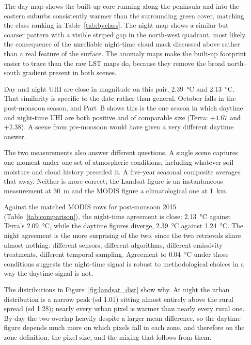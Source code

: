 \documentclass[11pt,a4paper]{article}
\begin{document}
The day map shows the built-up core running along the peninsula and
into the eastern suburbs consistently warmer than the surrounding
green cover, matching the class ranking in
Table~\ref{tab:byclass}. The night map shows a similar but coarser
pattern with a visible striped gap in the north-west quadrant, most
likely the consequence of the unreliable night-time cloud mask
discussed above rather than a real feature of the surface. The
anomaly maps make the built-up footprint easier to trace than the raw
LST maps do, because they remove the broad north--south gradient
present in both scenes.

Day and night UHI are close in magnitude on this pair,
\SI{2.39}{\degreeCelsius} and \SI{2.13}{\degreeCelsius}. That
similarity is specific to the date rather than general. October falls
in the post-monsoon season, and Part~B shows this is the one season in
which daytime and night-time UHI are both positive and of comparable
size (Terra: $+1.67$ and $+2.38$). A scene from pre-monsoon would have
given a very different daytime answer.

The two measurements also answer different questions. A single scene
captures one moment under one set of atmospheric conditions, including
whatever soil moisture and cloud history preceded it. A five-year
seasonal composite averages that away. Neither is more correct; the
Landsat figure is an instantaneous measurement at \SI{30}{\metre} and
the MODIS figure a climatological one at \SI{1}{\kilo\metre}.

Against the matched MODIS rows for post-monsoon 2015
(Table~\ref{tab:comparison}), the night-time agreement is close:
\SI{2.13}{\degreeCelsius} against Terra's \SI{2.09}{\degreeCelsius},
while the daytime figures diverge, \SI{2.39}{\degreeCelsius} against
\SI{1.24}{\degreeCelsius}. The night agreement is the more surprising
of the two, since the two retrievals share almost nothing: different
sensors, different algorithms, different emissivity treatments,
different temporal sampling. Agreement to \SI{0.04}{\degreeCelsius}
under those conditions suggests the night-time signal is robust to
methodological choices in a way the daytime signal is not.

The distributions in Figure~\ref{fig:landsat_dist} show why. At night
the urban distribution is a narrow peak (sd \num{1.01}) sitting almost
entirely above the rural spread (sd \num{1.28}); nearly every urban
pixel is warmer than nearly every rural one. By day the two overlap
heavily despite a larger mean difference, so the daytime figure
depends much more on which pixels fall in each zone, and therefore
on the zone definition, the pixel size, and the mixing that follows
from them.
\end{document}
